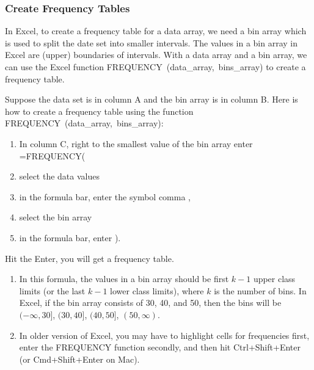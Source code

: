 \hypertarget{create-frequency-tables}{%
\subsubsection{Create Frequency Tables}\label{create-frequency-tables}}

In Excel, to create a frequency table for a data array, we need a bin
array which is used to split the date set into smaller intervals. The
values in a bin array in Excel are (upper) boundaries of intervals. With
a data array and a bin array, we can use the Excel function
\textsf{FREQUENCY\ (data\_array,\ bins\_array)} to create a frequency
table.

Suppose the data set is in column A and the bin array is in column B.
Here is how to create a frequency table using the function
\textsf{FREQUENCY\ (data\_array,\ bins\_array)}:

\begin{enumerate}[sepno]
\item
  In column C, right to the smallest value of the bin array enter
  \textsf{=FREQUENCY(}
\item
  select the data values
\item
  in the formula bar, enter the symbol comma \textsf{,}
\item
  select the bin array
\item
  in the formula bar, enter \textsf{)}.
\end{enumerate}

Hit the \textsf{Enter}, you will get a frequency table.

\begin{remark}

\begin{enumerate}[sepno]
\item
  In this formula, the values in a bin array should be first \(k-1\)
  upper class limits (or the last \(k-1\) lower class limits), where
  \(k\) is the number of bins. In Excel, if the bin array consists of
  30, 40, and 50, then the bins will be \((-\infty,30]\), \((30,40]\),
  \((40, 50]\), \((50, \infty)\).
\item
  In older version of Excel, you may have to highlight cells for
  frequencies first, enter the \textsf{FREQUENCY} function secondly, and
  then hit \textsf{Ctrl+Shift+Enter} (or \textsf{Cmd+Shift+Enter} on
  Mac).
\end{enumerate}

\end{remark}

